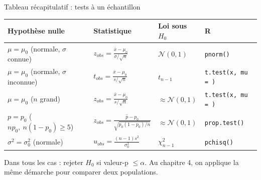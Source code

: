 \documentclass{BeamerTemplate}
\begin{document}
\begin{frame}[t]{Tableau récapitulatif : tests à un échantillon}
  \centering
  \footnotesize
  \renewcommand{\arraystretch}{1.7}
  \begin{tabular}{llll}\toprule
    \textbf{Hypothèse nulle} & \textbf{Statistique} & \textbf{Loi sous $H_0$} & \textbf{R} \\ \midrule
    $\mu = \mu_0$ (normale, $\sigma$ connue) & $z_{obs} = \frac{\bar{x} - \mu_0}{\sigma/\sqrt{n}}$ & $\mathcal{N}(0,1)$ & \texttt{pnorm()} \\
    $\mu = \mu_0$ (normale, $\sigma$ inconnue) & $t_{obs} = \frac{\bar{x} - \mu_0}{s/\sqrt{n}}$ & $t_{n-1}$ & \texttt{t.test(x, mu = )} \\
    $\mu = \mu_0$ ($n$ grand) & $z_{obs} = \frac{\bar{x} - \mu_0}{s/\sqrt{n}}$ & $\approx \mathcal{N}(0,1)$ & \texttt{t.test(x, mu = )} \\
    $p = p_0$ ($np_0,\ n(1-p_0) \ge 5$) & $z_{obs} = \frac{\hat{p} - p_0}{\sqrt{p_0(1-p_0)/n}}$ & $\approx \mathcal{N}(0,1)$ & \texttt{prop.test()} \\
    $\sigma^2 = \sigma_0^2$ (normale) & $u_{obs} = \frac{(n-1)s^2}{\sigma_0^2}$ & $\chi^2_{n-1}$ & \texttt{pchisq()} \\ \bottomrule
  \end{tabular}

  \raggedright
  \medskip
  \normalsize
  Dans tous les cas : \alert{rejeter $H_0$ si valeur-p $\le \alpha$}. Au \alert{chapitre 4}, on applique la même démarche pour \alert{comparer deux populations}.
\end{frame}
\end{document}
